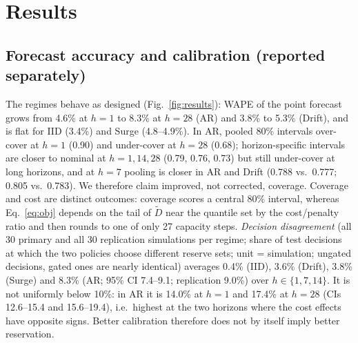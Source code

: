 \documentclass[conference]{IEEEtran}
\begin{document}
\section{Results}
\subsection{Forecast accuracy and calibration (reported separately)}
The regimes behave as designed (Fig.~\ref{fig:results}): WAPE of the point forecast grows from 4.6\% at $h{=}1$ to 8.3\% at $h{=}28$ (AR) and 3.8\% to 5.3\% (Drift), and is flat for IID (3.4\%) and Surge (4.8--4.9\%). In AR, pooled 80\% intervals over-cover at $h{=}1$ (0.90) and under-cover at $h{=}28$ (0.68); horizon-specific intervals are closer to nominal at $h{=}1,14,28$ (0.79, 0.76, 0.73) but still under-cover at long horizons, and at $h{=}7$ pooling is closer in AR and Drift (0.788 vs.\ 0.777; 0.805 vs.\ 0.783). We therefore claim improved, not corrected, coverage. Coverage and cost are distinct outcomes: coverage scores a central 80\% interval, whereas Eq.~\eqref{eq:obj} depends on the tail of $\tilde D$ near the quantile set by the cost/penalty ratio and then rounds to one of only 27 capacity steps. \emph{Decision disagreement} (all 30 primary and all 30 replication simulations per regime; share of test decisions at which the two policies choose different reserve sets; unit = simulation; ungated decisions, gated ones are nearly identical) averages 0.4\% (IID), 3.6\% (Drift), 3.8\% (Surge) and 8.3\% (AR; 95\% CI 7.4--9.1; replication 9.0\%) over $h\in\{1,7,14\}$. It is not uniformly below 10\%: in AR it is 14.0\% at $h{=}1$ and 17.4\% at $h{=}28$ (CIs 12.6--15.4 and 15.6--19.4), i.e.\ highest at the two horizons where the cost effects have opposite signs. Better calibration therefore does not by itself imply better reservation.
\end{document}
